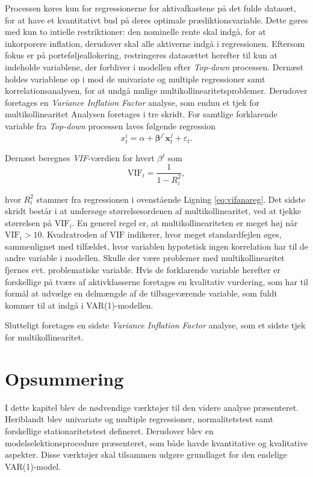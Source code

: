 \documentclass[
  a4paper,
  oneside]{memoir}
\begin{document}
Processen køres kun for regressionerne for aktivafkastene på det fulde datasæt, for at have et kvantitativt bud på deres optimale prædiktionsvariable. Dette gøres med kun to intielle restriktioner: den nominelle rente skal indgå, for at inkorporere inflation, derudover skal alle aktiverne indgå i regressionen. Eftersom fokus er på porteføljeallokering, restringeres datasættet herefter til kun at indeholde variablene, der forbliver i modellen efter \emph{Top-down} processen. Dernæst holdes variablene op i mod de univariate og multiple regressioner samt korrelationsanalysen, for at undgå mulige multikollinearitetsproblemer. Derudover foretages en \emph{Variance Inflation Factor} analyse, som endnu et tjek for multikollinearitet Analysen foretages i tre skridt. For samtlige forklarende variable fra \emph{Top-down} processen laves følgende regression
\begin{equation}
x_t^i=\alpha+\bm{\beta}^{j\prime}\bm{x}_t^{j}+\varepsilon_t. \label{eq:vifanareg}
\end{equation}

Dernæst beregnes \emph{VIF}-værdien for hvert \(\beta^j\) som
\[\text{VIF}_i=\frac{1}{1-R_i^2},\]

hvor \(R_i^2\) stammer fra regressionen i ovenstående Ligning \eqref{eq:vifanareg}. Det sidste skridt består i at undersøge størrelsesordenen af multikollinearitet, ved at tjekke størrelsen på \(\text{VIF}_i\). En generel regel er, at multikollineariteten er meget høj når \(\text{VIF}_i>10\). Kvadratroden af \(\text{VIF}\) indikerer, hvor meget standardfejlen øges, sammenlignet med tilfældet, hvor variablen hypotetisk ingen korrelation har til de andre variable i modellen. Skulle der være problemer med multikollinearitet fjernes evt. problematiske variable. Hvis de forklarende variable herefter er forskellige på tværs af aktivklasserne foretages en kvalitativ vurdering, som har til formål at udvælge en delmængde af de tilbageværende variable, som fuldt kommer til at indgå i VAR(1)-modellen.

Slutteligt foretages en sidste \emph{Variance Inflation Factor} analyse, som et sidste tjek for multikollinearitet.

\hypertarget{opsummering-2}{%
\section{Opsummering}\label{opsummering-2}}

I dette kapitel blev de nødvendige værktøjer til den videre analyse præsenteret. Heriblandt blev univariate og multiple regressioner, normalitetstest samt forskellige stationaritetstest defineret. Derudover blev en modelselektionsprocedure præsenteret, som både havde kvantitative og kvalitative aspekter. Disse værktøjer skal tilsammen udgøre grundlaget for den endelige VAR(1)-model.
\end{document}

